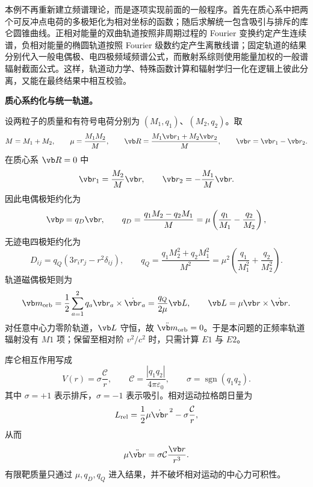 本例不再重新建立频谱理论，而是逐项实现前面的一般程序。首先在质心系中把两个可反冲点电荷的多极矩化为相对坐标的函数；随后求解统一包含吸引与排斥的库仑圆锥曲线。正相对能量的双曲轨道按照非周期过程的 Fourier 变换约定产生连续谱，负相对能量的椭圆轨道按照 Fourier 级数约定产生离散线谱；固定轨道的结果分别代入一般电偶极、电四极频域频谱公式，而散射系综则使用能量加权的一般谱辐射截面公式。这样，轨道动力学、特殊函数计算和辐射学归一化在逻辑上彼此分离，又能在最终结果中相互校验。

\textbf{质心系约化与统一轨道。}

设两粒子的质量和有符号电荷分别为 $(M_1,q_1)$、$(M_2,q_2)$。取
\begin{equation*}
	M=M_1+M_2,
	\qquad
	\mu=\frac{M_1M_2}{M},
	\qquad
	\vb R=\frac{M_1\vb r_1+M_2\vb r_2}{M},
	\qquad
	\vb r=\vb r_1-\vb r_2.
\end{equation*}
在质心系 $\vb R=0$ 中
\begin{equation*}
	\vb r_1=\frac{M_2}{M}\vb r,
	\qquad
	\vb r_2=-\frac{M_1}{M}\vb r.
\end{equation*}
因此电偶极矩约化为
\begin{equation*}
	\vb p=q_D\vb r,
	\qquad
	q_D=\frac{q_1M_2-q_2M_1}{M}
	=\mu\left(\frac{q_1}{M_1}-\frac{q_2}{M_2}\right),
\end{equation*}
无迹电四极矩约化为
\begin{equation*}
	D_{ij}=q_Q\left(3r_ir_j-r^2\delta_{ij}\right),
	\qquad
	q_Q=\frac{q_1M_2^2+q_2M_1^2}{M^2}
	=\mu^2\left(\frac{q_1}{M_1^2}+\frac{q_2}{M_2^2}\right).
\end{equation*}
轨道磁偶极矩则为
\begin{equation*}
	\vb m_{\mathrm{orb}}
	=\frac{1}{2}\sum_{a=1}^2q_a\vb r_a\times\dot{\vb r}_a
	=\frac{q_Q}{2\mu}\vb L,
	\qquad
	\vb L=\mu\vb r\times\dot{\vb r}.
\end{equation*}
对任意中心力零阶轨道，$\vb L$ 守恒，故 $\ddot{\vb m}_{\mathrm{orb}}=0$。于是本问题的正频率轨道辐射没有 $M1$ 项；保留至相对阶 $v^2/c^2$ 时，只需计算 $E1$ 与 $E2$。

库仑相互作用写成
\begin{equation*}
	V(r)=\sigma\frac{\mathcal C}{r},
	\qquad
	\mathcal C=\frac{|q_1q_2|}{4\pi\varepsilon_0},
	\qquad
	\sigma=\operatorname{sgn}(q_1q_2).
\end{equation*}
其中 $\sigma=+1$ 表示排斥，$\sigma=-1$ 表示吸引。相对运动拉格朗日量为
\begin{equation*}
	L_{\mathrm{rel}}=\frac{1}{2}\mu\dot{\vb r}^{\,2}-\sigma\frac{\mathcal C}{r},
\end{equation*}
从而
\begin{equation*}
	\mu\ddot{\vb r}=\sigma\mathcal C\frac{\vb r}{r^3}.
\end{equation*}
有限靶质量只通过 $\mu,q_D,q_Q$ 进入结果，并不破坏相对运动的中心力可积性。

